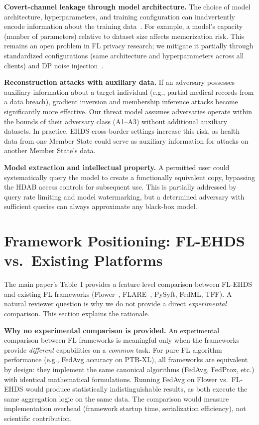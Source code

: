 \documentclass[conference]{IEEEtran}
\begin{document}
\textbf{Covert-channel leakage through model architecture.} The choice of model architecture, hyperparameters, and training configuration can inadvertently encode information about the training data~\cite{carlini2022privacy}. For example, a model's capacity (number of parameters) relative to dataset size affects memorization risk. This remains an open problem in FL privacy research; we mitigate it partially through standardized configurations (same architecture and hyperparameters across all clients) and DP noise injection~\cite{carlini2022privacy}.

\textbf{Reconstruction attacks with auxiliary data.} If an adversary possesses auxiliary information about a target individual (e.g., partial medical records from a data breach), gradient inversion and membership inference attacks become significantly more effective. Our threat model assumes adversaries operate within the bounds of their adversary class (A1--A3) without additional auxiliary datasets. In practice, EHDS cross-border settings increase this risk, as health data from one Member State could serve as auxiliary information for attacks on another Member State's data.

\textbf{Model extraction and intellectual property.} A permitted user could systematically query the model to create a functionally equivalent copy, bypassing the HDAB access controls for subsequent use. This is partially addressed by query rate limiting and model watermarking, but a determined adversary with sufficient queries can always approximate any black-box model.

\section{Framework Positioning: FL-EHDS vs.\ Existing Platforms}
\label{sec:framework_comparison}

The main paper's Table~I provides a feature-level comparison between FL-EHDS and existing FL frameworks (Flower~\cite{beutel2023flower}, FLARE~\cite{nvflare2023}, PySyft, FedML, TFF). A natural reviewer question is why we do not provide a direct \textit{experimental} comparison. This section explains the rationale.

\textbf{Why no experimental comparison is provided.} An experimental comparison between FL frameworks is meaningful only when the frameworks provide \textit{different} capabilities on a \textit{common} task. For pure FL algorithm performance (e.g., FedAvg accuracy on PTB-XL), all frameworks are equivalent by design: they implement the same canonical algorithms (FedAvg, FedProx, etc.) with identical mathematical formulations. Running FedAvg on Flower vs.\ FL-EHDS would produce statistically indistinguishable results, as both execute the same aggregation logic on the same data. The comparison would measure implementation overhead (framework startup time, serialization efficiency), not scientific contribution.
\end{document}
